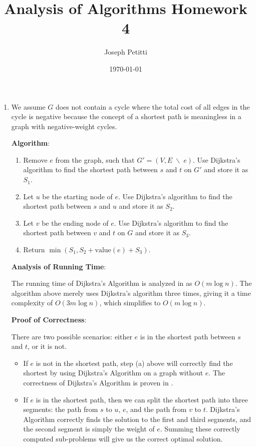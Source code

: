 \documentclass[a4paper, 10pt]{article}
\title{Analysis of Algorithms Homework 4}
\author{Joseph Petitti}
\date{\today}
\begin{document}
\IncMargin{1em}

\maketitle

\begin{enumerate}
	\item 
		We assume $G$ does not contain a cycle where the total cost of all edges
		in the cycle is negative because the concept of a shortest path is
		meaningless in a graph with negative-weight cycles.

		\textbf{Algorithm}:

		\begin{enumerate}
			\item Remove $e$ from the graph, such that $G' = (V, E \; \backslash
				\; e)$. Use Dijkstra's algorithm to find the shortest path
				between $s$ and $t$ on $G'$ and store it as $S_1$.
			\item Let $u$ be the starting node of $e$. Use Dijkstra's algorithm
				to find the shortest path between $s$ and $u$ and store it as
				$S_2$.
			\item Let $v$ be the ending node of $e$. Use Dijkstra's algorithm to
				find the shortest path between $v$ and $t$ on $G$ and store it
				as $S_3$.
			\item Return $\min ( S_1, S_2 + \textrm{value}(e) + S_3 )$.
		\end{enumerate}

		\textbf{Analysis of Running Time}:

		The running time of Dijkstra's Algorithm is analyzed in
		\cite[p. 141]{algorithmdesign} as $O(m \log n)$. The algorithm above
		merely uses Dijkstra's algorithm three times, giving it a time
		complexity of $O(3m \log n)$, which simplifies to $O(m \log n)$.

		\textbf{Proof of Correctness}:

		There are two possible scenarios: either $e$ is in the shortest path
		between $s$ and $t$, or it is not.

		\begin{itemize}
			\item If $e$ is not in the shortest path, step (a) above will
				correctly find the shortest by using Dijkstra's Algorithm on a
				graph without $e$. The correctness of Dijkstra's Algorithm is
				proven in \cite[p. 139]{algorithmdesign}.
			\item If $e$ is in the shortest path, then we can split the shortest
				path into three segments: the path from $s$ to $u$, $e$, and the
				path from $v$ to $t$. Dijkstra's Algorithm correctly finds the
				solution to the first and third segments, and the second segment
				is simply the weight of $e$. Summing these correctly computed
				sub-problems will give us the correct optimal solution.
		\end{itemize}


\end{enumerate}
\end{document}
